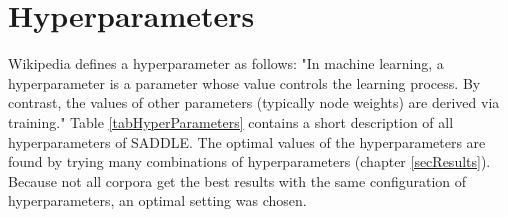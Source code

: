 %
%

\section{Hyperparameters}
\label{secHyperParameters}
Wikipedia defines a hyperparameter as follows: "In machine learning, a hyperparameter is a parameter whose value controls the learning process. By contrast, the values of other parameters (typically node weights) are derived via training." Table \ref{tabHyperParameters} contains a short description of all hyperparameters of SADDLE. The optimal values of the hyperparameters are found by trying many combinations of hyperparameters (chapter \ref{secResults}). Because not all corpora get the best results with the same configuration of hyperparameters, an optimal setting was chosen.\\

